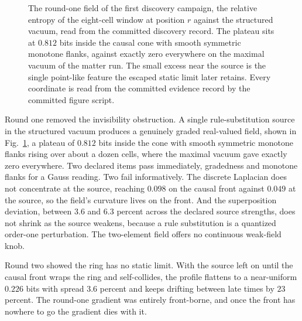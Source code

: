 \documentclass[aps,pre,reprint,nofootinbib]{revtex4-2}
\begin{document}
\begin{figure}[t]
\centering
{}
\caption{The round-one field of the first discovery campaign, the
relative entropy of the eight-cell window at position $r$ against
the structured vacuum, read from the committed discovery record.
The plateau sits at $0.812$ bits inside the causal cone with smooth
symmetric monotone flanks, against exactly zero everywhere on the
maximal vacuum of the matter run.  The small excess near the source
is the single point-like feature the escaped static limit later
retains.  Every coordinate is read from the committed evidence
record by the committed figure script.}
\label{fig:eg4b}
\end{figure}

Round one removed the invisibility obstruction.  A single
rule-substitution source in the structured vacuum produces a
genuinely graded real-valued field, shown in Fig.~\ref{fig:eg4b}, a
plateau of $0.812$ bits inside the cone with smooth symmetric
monotone flanks rising over about a dozen cells, where the maximal
vacuum gave exactly zero everywhere.  Two declared items pass
immediately, gradedness and monotone flanks for a Gauss reading.
Two fail informatively.  The discrete Laplacian does not concentrate
at the source, reaching $0.098$ on the causal front against $0.049$
at the source, so the field's curvature lives on the front.  And the
superposition deviation, between $3.6$ and $6.3$ percent across the
declared source strengths, does not shrink as the source weakens,
because a rule substitution is a quantized order-one perturbation.
The two-element field offers no continuous weak-field knob.

Round two showed the ring has no static limit.  With the source left
on until the causal front wraps the ring and self-collides, the
profile flattens to a near-uniform $0.226$ bits with spread $3.6$
percent and keeps drifting between late times by $23$ percent.  The
round-one gradient was entirely front-borne, and once the front has
nowhere to go the gradient dies with it.
\end{document}
